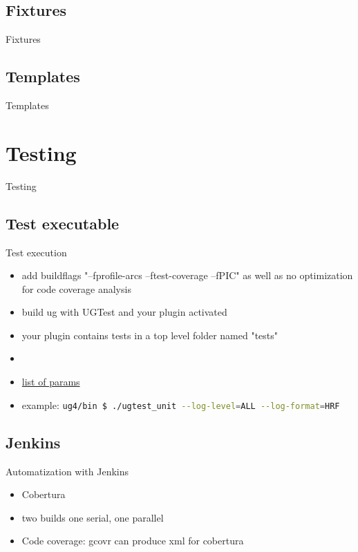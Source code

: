 \documentclass{beamer}
\newcommand{\sectiontitle}[1]{
    \section{#1}
    \begin{frame}
        \centering
        \LARGE{#1}
    \end{frame}
}
\begin{document}
        \subsection{Fixtures}
        \begin{frame}[plain]{Fixtures}
            
        \end{frame}

        \subsection{Templates}
        \begin{frame}[plain]{Templates}
            
        \end{frame}

    \sectiontitle{Testing}
        \subsection{Test executable}
        \begin{frame}{Test execution}
            \begin{itemize}
                \item add buildflags "--fprofile-arcs --ftest-coverage --fPIC" as well as no optimization for code coverage analysis
                \item build ug with UGTest and your plugin activated
                \item your plugin contains tests in a top level folder named "tests"
                \item %
                \item \href{https://www.boost.org/doc/libs/1_58_0/libs/test/doc/html/utf/user-guide/runtime-config/reference.html}{list of params}
                \item example: \lstinline[language=bash]{ug4/bin $ ./ugtest_unit --log-level=ALL --log-format=HRF}
            \end{itemize}
        \end{frame}
        
        \subsection{Jenkins}
        \begin{frame}{Automatization with Jenkins}
            \begin{itemize}
                \item Cobertura
                \item two builds one serial, one parallel
                \item Code coverage: gcovr can produce xml for cobertura
            \end{itemize}
        \end{frame}
\end{document}
